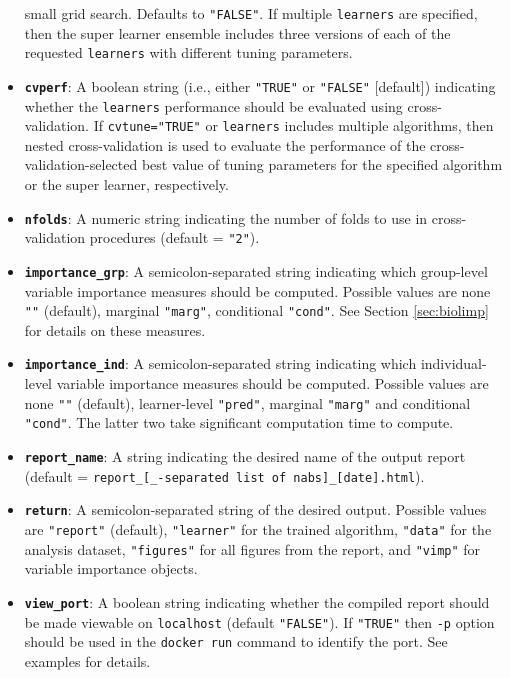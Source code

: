 \documentclass[]{article}
\begin{document}
\begin{itemize}
  small grid search. Defaults to \texttt{"FALSE"}. If multiple
  \texttt{learners} are specified, then the super learner ensemble
  includes three versions of each of the requested \texttt{learners}
  with different tuning parameters.
\item
  \textbf{\texttt{cvperf}}: A boolean string (i.e., either
  \texttt{"TRUE"} or \texttt{"FALSE"} {[}default{]}) indicating whether
  the \texttt{learners} performance should be evaluated using
  cross-validation. If \texttt{cvtune="TRUE"} or \texttt{learners}
  includes multiple algorithms, then nested cross-validation is used to
  evaluate the performance of the cross-validation-selected best value
  of tuning parameters for the specified algorithm or the super learner,
  respectively.
\item
  \textbf{\texttt{nfolds}}: A numeric string indicating the number of
  folds to use in cross-validation procedures (default = \texttt{"2"}).
\item
  \textbf{\texttt{importance\_grp}}: A semicolon-separated string
  indicating which group-level variable importance measures should be
  computed. Possible values are none \texttt{""} (default), marginal
  \texttt{"marg"}, conditional \texttt{"cond"}. See Section
  \ref{sec:biolimp} for details on these measures.
\item
  \textbf{\texttt{importance\_ind}}: A semicolon-separated string
  indicating which individual-level variable importance measures should
  be computed. Possible values are none \texttt{""} (default),
  learner-level \texttt{"pred"}, marginal \texttt{"marg"} and
  conditional \texttt{"cond"}. The latter two take significant
  computation time to compute.
\item
  \textbf{\texttt{report\_name}}: A string indicating the desired name
  of the output report (default =
  \texttt{report\_{[}\_-separated\ list\ of\ nabs{]}\_{[}date{]}.html}).
\item
  \textbf{\texttt{return}}: A semicolon-separated string of the desired
  output. Possible values are \texttt{"report"} (default),
  \texttt{"learner"} for the trained algorithm, \texttt{"data"} for the
  analysis dataset, \texttt{"figures"} for all figures from the report,
  and \texttt{"vimp"} for variable importance objects.
\item
  \textbf{\texttt{view\_port}}: A boolean string indicating whether the
  compiled report should be made viewable on \texttt{localhost} (default
  \texttt{"FALSE"}). If \texttt{"TRUE"} then \texttt{-p} option should
  be used in the \texttt{docker\ run} command to identify the port. See
  examples for details.
\end{itemize}
\end{document}
